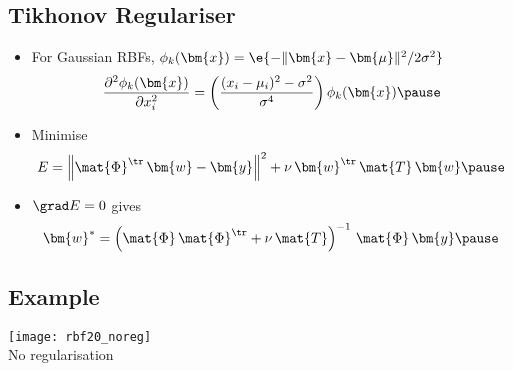 
\begin{slide}
\section{Tikhonov Regulariser}

\begin{PauseHighLight}


\begin{itemize}
\item For Gaussian RBFs, $\phi_k(\bm{x}) =
  \e{-\|\bm{x}-\bm{\mu}\|^2/2\sigma^2}$
  \begin{displaymath}
    \frac{\partial^2 \phi_k(\bm{x})}{\partial x_i^2} = \left(
      \frac{(x_i-\mu_i)^2-\sigma^2}{\sigma^4} \right)\phi_k(\bm{x})
    \pause
  \end{displaymath}
\item Minimise
  \begin{displaymath}
    E = \left\| \strut \mat{\Phi}^\tr\, \bm{w}-\bm{y} \right\|^2 + \nu\,
    \bm{w}^\tr \, \mat{T} \,\bm{w}\pause
  \end{displaymath}
\item $\grad E=0$ gives
  \begin{displaymath}
    \bm{w}^* = \left( \strut \mat{\Phi} \, \mat{\Phi}^\tr + \nu\, \mat{T}
    \right)^{-1}\, \mat{\Phi}\, \bm{y}\pause
  \end{displaymath}
\end{itemize}


\end{PauseHighLight}
\end{slide}


\begin{slide}
\section[-1]{Example}

\begin{center}
  \texttt{[image: rbf20\_noreg]}\\
  No regularisation\pause
\end{center}

\end{slide}


